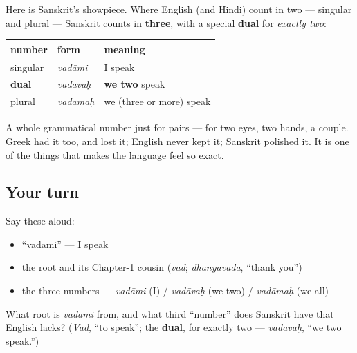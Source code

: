 \begin{grammarlens}[title={Grammar Lens: singular, DUAL, and plural}]
Here is Sanskrit's showpiece. Where English (and Hindi) count in two — singular and plural — Sanskrit counts in \textbf{three}, with a special \textbf{dual} for \emph{exactly two}:

\noindent
\begin{tabularx}{\linewidth}{@{}>{\raggedright\arraybackslash}X>{\raggedright\arraybackslash}X>{\raggedright\arraybackslash}X@{}}
\toprule
\textbf{number} & \textbf{form} & \textbf{meaning} \\
\midrule
singular & \emph{vadāmi} & I speak \\
\textbf{dual} & \emph{vadāvaḥ} & \textbf{we two} speak \\
plural & \emph{vadāmaḥ} & we (three or more) speak \\
\bottomrule
\end{tabularx}

A whole grammatical number just for pairs — for two eyes, two hands, a couple. Greek had it too, and lost it; English never kept it; Sanskrit polished it. It is one of the things that makes the language feel so exact.
\end{grammarlens}

\subsection*{Your turn}
Say these aloud:

\begin{itemize}
\raggedright
  \item \textquotedblleft{}vadāmi\textquotedblright{} — I speak
  \item the root and its Chapter-1 cousin (\emph{vad}; \emph{dhanyavāda}, \textquotedblleft{}thank you\textquotedblright{})
  \item the three numbers — \emph{vadāmi} (I) / \emph{vadāvaḥ} (we two) / \emph{vadāmaḥ} (we all)
\end{itemize}

\begin{tcolorbox}[breakable,colback=teal!4,colframe=teal!35!black,title={Before you move on}]
What root is \emph{vadāmi} from, and what third \textquotedblleft{}number\textquotedblright{} does Sanskrit have that English lacks? (\emph{Vad}, \textquotedblleft{}to speak\textquotedblright{}; the \textbf{dual}, for exactly two — \emph{vadāvaḥ}, \textquotedblleft{}we two speak.\textquotedblright{})
\end{tcolorbox}
